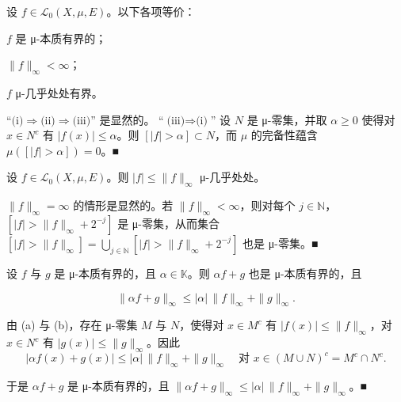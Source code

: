 \begin{remark}

\begin{items}
\item

设 $ f \in \mathcal{L}_0(X,\mu,E) $。以下各项等价：

\begin{subitems}
\item

$ f $ 是 μ-本质有界的；

\item

$ \|f\|_\infty < \infty $；

\item

$ f $ μ-几乎处处有界。

\proofhead
“$ \text{(i)} \Rightarrow \text{(ii)} \Rightarrow \text{(iii)} $” 是显然的。
“$ \text{(iii)} \Rightarrow \text{(i)} $” 设 $ N $ 是 μ-零集，并取 $ \alpha \ge 0 $ 使得对 $ x \in N^c $ 有 $ |f(x)| \le \alpha $。则 $ [|f| > \alpha] \subset N $，而 $ \mu $ 的完备性蕴含 $ \mu([|f| > \alpha]) = 0 $。\nobreak\hspace{0.35em}■
\end{subitems}

\item

设 $ f \in \mathcal{L}_0(X,\mu,E) $。则 $ |f| \le \|f\|_\infty $ μ-几乎处处。

\proofhead
$ \|f\|_\infty = \infty $ 的情形是显然的。若 $ \|f\|_\infty < \infty $，则对每个 $ j \in \mathbb{N} $，$ [|f| > \|f\|_\infty + 2^{-j}] $ 是 μ-零集，从而集合 $ [|f| > \|f\|_\infty] = \bigcup_{j \in \mathbb{N}}[|f| > \|f\|_\infty + 2^{-j}] $ 也是 μ-零集。\nobreak\hspace{0.35em}■
\item

设 $ f $ 与 $ g $ 是 μ-本质有界的，且 $ \alpha \in \mathbb{K} $。则 $ \alpha f + g $ 也是 μ-本质有界的，且

\[
\|\alpha f + g\|_\infty \le |\alpha|\,\|f\|_\infty + \|g\|_\infty .
\]

\proofhead
由 (a) 与 (b)，存在 μ-零集 $ M $ 与 $ N $，使得对 $ x \in M^c $ 有 $ |f(x)| \le \|f\|_\infty $，对 $ x \in N^c $ 有 $ |g(x)| \le \|g\|_\infty $。因此
\[
|\alpha f(x) + g(x)| \le |\alpha|\,\|f\|_\infty + \|g\|_\infty \quad \text{对 } x \in (M \cup N)^c = M^c \cap N^c .
\]

于是 $ \alpha f + g $ 是 μ-本质有界的，且 $ \|\alpha f + g\|_\infty \le |\alpha|\,\|f\|_\infty + \|g\|_\infty $。\nobreak\hspace{0.35em}■


\end{items}
\end{remark}
